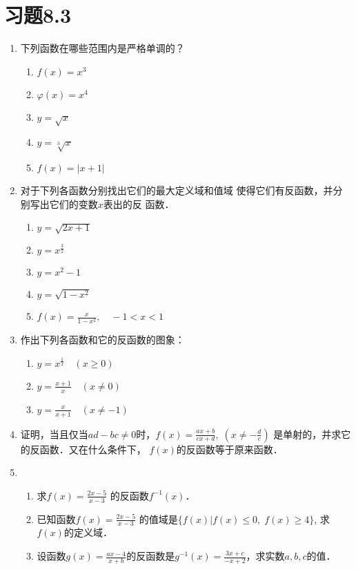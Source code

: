 \section*{习题8.3}
\begin{enumerate}
\item 下列函数在哪些范围内是严格单调的？
\begin{multicols}{2}
  \begin{enumerate}
    \item $f(x)=x^3$
    \item $\varphi(x)=x^4$
    \item $y=\sqrt{x}$
    \item $y=\sqrt[3]{x}$
    \item $f(x)=|x+1|$
\end{enumerate}  
\end{multicols}


\item 对于下列各函数分别找出它们的最大定义域和值域
使得它们有反函数，并分别写出它们的变数$x$表出的反
函数．
\begin{multicols}{2}
    \begin{enumerate}
      \item $y=\sqrt{2x+1}$
      \item $y=x^{\tfrac{3}{2}}$
      \item $y=x^2-1$
      \item $y=\sqrt{1-x^2}$
      \item $f(x)=\frac{x}{1-x^2},\quad -1<x<1$
  \end{enumerate}  
  \end{multicols}

\item 作出下列各函数和它的反函数的图象：
\begin{multicols}{2}
    \begin{enumerate}
      \item $y=x^{\tfrac{1}{2}}\quad (x\ge 0)$
      \item $y=\frac{x+1}{x}\quad (x\ne 0)$
      \item $y=\frac{x}{x+1}\quad (x\ne -1)$
  \end{enumerate}  
  \end{multicols}

\item 证明，当且仅当$ad-bc\ne 0$时，$f(x)=\frac{ax+b}{cx+d},\; \left(x\ne -\frac{d}{c}\right)$
是单射的，并求它的反函数．又在什么条件下，
$f(x)$的反函数等于原来函数．
\item \begin{enumerate}
\item 求$f(x)=\frac{2x-5}{x-3}$
的反函数$f^{-1}(x)$．
\item 已知函数$f(x)=\frac{2x-5}{x-3}$
的值域是$\{f(x)|f(x)\le 0,\; f(x)\ge 4\}$, 求$f(x)$的定义域．
\item 设函数$g(x)=\frac{ax-4}{x+b}$的反函数是$g^{-1}(x)=\frac{3x+c}{-x+2}$，求实数$a,b,c$的值．
\end{enumerate}


\end{enumerate}
